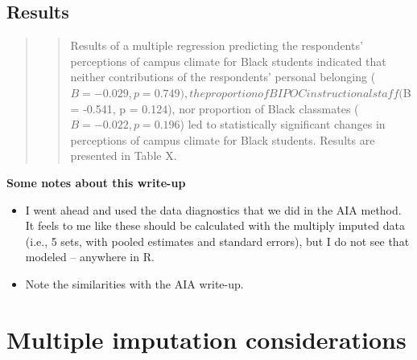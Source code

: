 \documentclass[
  11pt,
]{book}
\providecommand{\tightlist}{%
  \setlength{\itemsep}{0pt}\setlength{\parskip}{0pt}}
\begin{document}
\hypertarget{results-3}{%
\subsection{Results}\label{results-3}}

\begin{quote}
\begin{quote}
Results of a multiple regression predicting the respondents' perceptions of campus climate for Black students indicated that neither contributions of the respondents' personal belonging (\(B = -0.029, p = 0.749), the proportion of BIPOC instructional staff (\)B = -0.541, p = 0.124), nor proportion of Black classmates (\(B = -0.022, p = 0.196\)) led to statistically significant changes in perceptions of campus climate for Black students. Results are presented in Table X.
\end{quote}
\end{quote}

\textbf{Some notes about this write-up}

\begin{itemize}
\tightlist
\item
  I went ahead and used the data diagnostics that we did in the AIA method. It feels to me like these should be calculated with the multiply imputed data (i.e., 5 sets, with pooled estimates and standard errors), but I do not see that modeled -- anywhere in R.
\item
  Note the similarities with the AIA write-up.
\end{itemize}

\hypertarget{multiple-imputation-considerations}{%
\section{Multiple imputation considerations}\label{multiple-imputation-considerations}}
\end{document}
